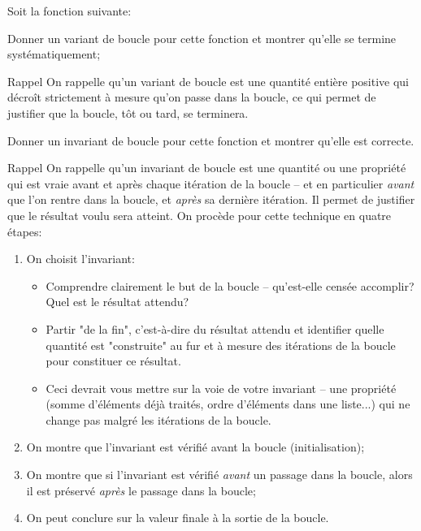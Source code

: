 \documentclass[12pt]{article}
\begin{document}
	\begin{MonExo}
		Soit la fonction suivante:
		\begin{alphenum}
			\item Donner un variant de boucle pour cette fonction et montrer qu'elle se termine systématiquement;
			\begin{MonAmp}{Rappel}
				On rappelle qu'un variant de boucle est une quantité entière positive qui décroît strictement à mesure qu'on passe dans la boucle, ce qui permet de justifier que la boucle, tôt ou tard, se terminera.
			\end{MonAmp}
			\item Donner un invariant de boucle pour cette fonction et montrer qu'elle est correcte.
			\begin{MonAmp}{Rappel}
				On rappelle qu'un invariant de boucle est une quantité ou une propriété qui est vraie avant et après chaque itération de la boucle -- et en particulier \textit{avant} que l'on rentre dans la boucle, et \textit{après} sa dernière itération. Il permet de justifier que le résultat voulu sera atteint. On procède pour cette technique en quatre étapes:
				\begin{enumerate}
					\item On choisit l'invariant:
					\begin{itemize}
						\item Comprendre clairement le but de la boucle -- qu'est-elle censée accomplir? Quel est le résultat attendu?
						\item Partir "de la fin", c'est-à-dire du résultat attendu et identifier quelle quantité est "construite" au fur et à mesure des itérations de la boucle pour constituer ce résultat.
						\item Ceci devrait vous mettre sur la voie de votre invariant -- une propriété (somme d'éléments déjà traités, ordre d'éléments dans une liste...) qui ne change pas malgré les itérations de la boucle.
					\end{itemize}
					\item On montre que l’invariant est vérifié avant la boucle (initialisation);
					\item On montre que si l'invariant est vérifié \textit{avant }un passage dans la boucle, alors il est préservé \textit{après }le passage dans la boucle;
					\item On peut conclure sur la valeur finale à la sortie de la boucle.
				\end{enumerate}
			\end{MonAmp}
		\end{alphenum}
	\end{MonExo}
	
\end{document}
